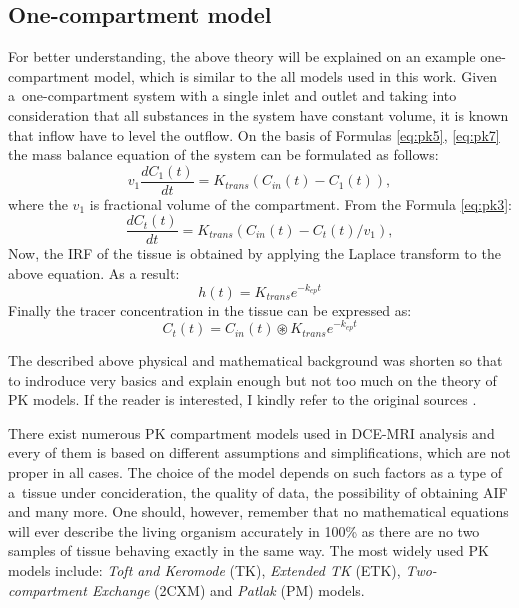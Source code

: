 \subsection{One-compartment model}
For better understanding, the above theory will be explained on an example one-compartment model, which is similar to the all models used in this work. Given a~one-compartment system with a single inlet and outlet and taking into consideration that all substances in the system have constant volume, it is known that inflow have to level the outflow. On the basis of Formulas \ref{eq:pk5}, \ref{eq:pk7} the mass balance equation of the system can be formulated as follows:
\begin{equation}
v_1\frac{dC_1(t)}{dt} = K_{trans}(C_{in}(t)-C_1(t)),
\end{equation}
where the $v_1$ is fractional volume of the compartment. From the Formula \ref{eq:pk3}:
\begin{equation}
\frac{dC_t(t)}{dt} = K_{trans}(C_{in}(t)-C_t(t)/v_1),
\label{eq:laplace}
\end{equation}
Now, the IRF of the tissue is obtained by applying the Laplace transform to the above equation. As a result:
\begin{equation}
h(t) = K_{trans}e^{-k_{ep}t}
\end{equation}
Finally the tracer concentration in the tissue can be expressed as:
\begin{equation}
	C_{t}(t) = C_{in}(t)\circledast  K_{trans}e^{-k_{ep}t} 
\end{equation}


The described above physical and mathematical background was shorten so that to indroduce very basics and explain enough but not too much on the theory of PK models. If the reader is interested, I kindly refer to the original sources \cite{sourbron2011scope}. 

There exist numerous PK compartment models used in DCE-MRI analysis and every of them is based on different assumptions and simplifications, which are not proper in all cases. The choice of the model depends on such factors as a type of a~tissue under concideration, the quality of data, the possibility of obtaining AIF and many more. One should, however, remember that no mathematical equations will ever describe the living organism accurately in 100\% as there are no two samples of tissue behaving exactly in the same way. The most widely used PK models include: \textit{Toft and Keromode} (TK), \textit{Extended TK} (ETK), \textit{Two-compartment Exchange} (2CXM) and \textit{Patlak} (PM) models.  

